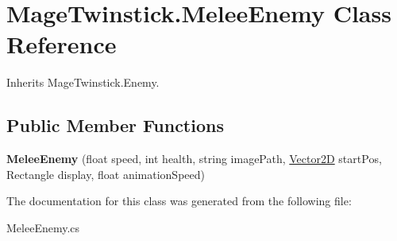 \hypertarget{class_mage_twinstick_1_1_melee_enemy}{}\section{Mage\+Twinstick.\+Melee\+Enemy Class Reference}
\label{class_mage_twinstick_1_1_melee_enemy}


Inherits Mage\+Twinstick.\+Enemy.

\subsection*{Public Member Functions}
\begin{DoxyCompactItemize}
\item 
\hypertarget{class_mage_twinstick_1_1_melee_enemy_a57032b177c12225e99ce837002bead9b}{}{\bfseries Melee\+Enemy} (float speed, int health, string image\+Path, \hyperlink{class_mage_twinstick_1_1_vector2_d}{Vector2\+D} start\+Pos, Rectangle display, float animation\+Speed)\label{class_mage_twinstick_1_1_melee_enemy_a57032b177c12225e99ce837002bead9b}

\end{DoxyCompactItemize}


The documentation for this class was generated from the following file\+:\begin{DoxyCompactItemize}
\item 
Melee\+Enemy.\+cs\end{DoxyCompactItemize}
